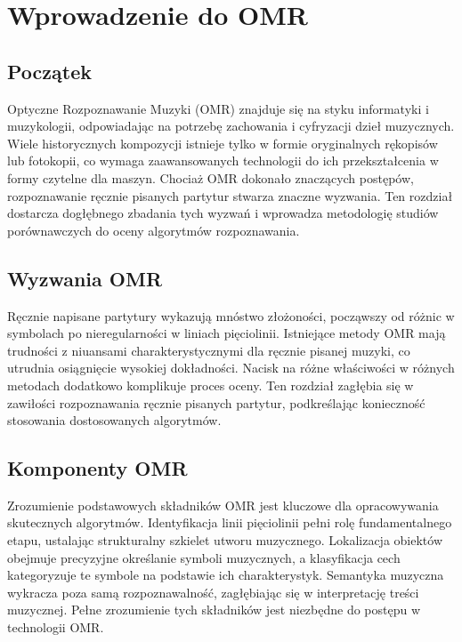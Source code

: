 \documentclass[12pt]{report}
\begin{document}
\chapter{Wprowadzenie do OMR}

\section{Początek}

Optyczne Rozpoznawanie Muzyki (OMR) znajduje się na styku informatyki i muzykologii, odpowiadając na potrzebę zachowania i cyfryzacji dzieł muzycznych. Wiele historycznych kompozycji istnieje tylko w formie oryginalnych rękopisów lub fotokopii, co wymaga zaawansowanych technologii do ich przekształcenia w formy czytelne dla maszyn. Chociaż OMR dokonało znaczących postępów, rozpoznawanie ręcznie pisanych partytur stwarza znaczne wyzwania. Ten rozdział dostarcza dogłębnego zbadania tych wyzwań i wprowadza metodologię studiów porównawczych do oceny algorytmów rozpoznawania.

\section{Wyzwania OMR}

Ręcznie napisane partytury wykazują mnóstwo złożoności, począwszy od różnic w symbolach po nieregularności w liniach pięciolinii. Istniejące metody OMR mają trudności z niuansami charakterystycznymi dla ręcznie pisanej muzyki, co utrudnia osiągnięcie wysokiej dokładności. Nacisk na różne właściwości w różnych metodach dodatkowo komplikuje proces oceny. Ten rozdział zagłębia się w zawiłości rozpoznawania ręcznie pisanych partytur, podkreślając konieczność stosowania dostosowanych algorytmów.

\section{Komponenty OMR}

Zrozumienie podstawowych składników OMR jest kluczowe dla opracowywania skutecznych algorytmów. Identyfikacja linii pięciolinii pełni rolę fundamentalnego etapu, ustalając strukturalny szkielet utworu muzycznego. Lokalizacja obiektów obejmuje precyzyjne określanie symboli muzycznych, a klasyfikacja cech kategoryzuje te symbole na podstawie ich charakterystyk. Semantyka muzyczna wykracza poza samą rozpoznawalność, zagłębiając się w interpretację treści muzycznej. Pełne zrozumienie tych składników jest niezbędne do postępu w technologii OMR.
\end{document}
